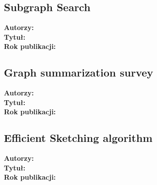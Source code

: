 \documentclass{article}
\begin{document}
        \subsection{Subgraph Search\cite{Li_Zou_Ozsu_Zhao_2019}}
            \textbf{Autorzy: } \\
            \textbf{Tytuł: } \\
            \textbf{Rok publikacji: } \\

        \subsection{Graph summarization survey\cite{Liu_Safavi_Dighe_Koutra_2018}}
            \textbf{Autorzy: } \\
            \textbf{Tytuł: } \\
            \textbf{Rok publikacji: } \\

        \subsection{Efficient Sketching algorithm\cite{Lemiesz_2023}}
            \textbf{Autorzy: } \\
            \textbf{Tytuł: } \\
            \textbf{Rok publikacji: } \\

     
    
\end{document}
